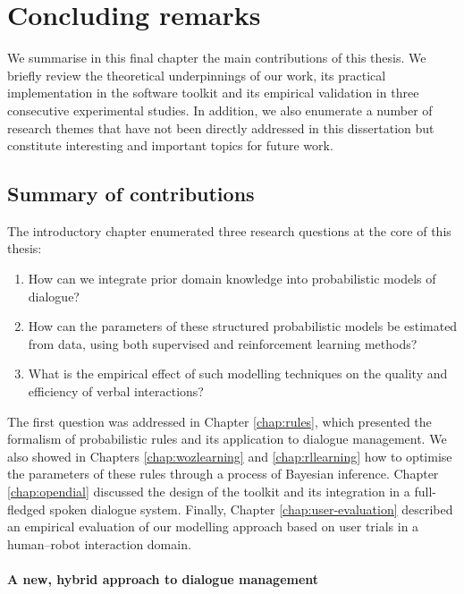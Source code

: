\chapter{Concluding remarks}
\label{chap:conclusions}

We summarise in this final chapter the main contributions of this thesis.  We briefly review the theoretical underpinnings of our work, its practical implementation in the \opendial{} software toolkit and its empirical validation in three consecutive experimental studies.  In addition, we also enumerate a number of research themes that have not been directly addressed in this dissertation but constitute interesting and important topics for future work. 

\section{Summary of contributions}

The introductory chapter enumerated three research questions at the core of this thesis:
\begin{enumerate}
\item How can we integrate prior domain knowledge into probabilistic models of dialogue?
\item How can the parameters of these structured probabilistic models be estimated from data, using both supervised and reinforcement learning methods?  
\item What is the empirical effect of such modelling techniques on the quality and efficiency of verbal interactions?
\end{enumerate}

The first question was addressed in Chapter \ref{chap:rules}, which presented the formalism of probabilistic rules and its application to dialogue management.  We also showed in Chapters \ref{chap:wozlearning} and \ref{chap:rllearning} how to optimise the parameters of these rules through a process of Bayesian inference.  Chapter \ref{chap:opendial} discussed the design of the \opendial{} toolkit and its integration in a full-fledged spoken dialogue system. Finally, Chapter \ref{chap:user-evaluation} described an empirical evaluation of our modelling approach based on user trials in a human--robot interaction domain.

\subsubsection*{A new, hybrid approach to dialogue management}


